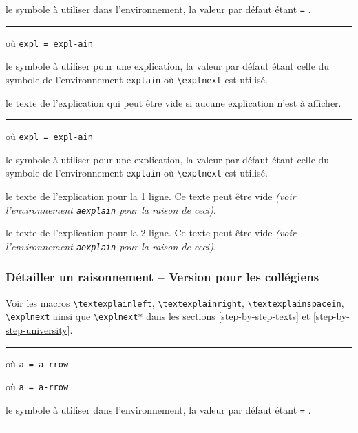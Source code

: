 \documentclass[12pt,a4paper]{article}
\newcommand\env[1]{\texttt{#1}}
\newcommand\macro[1]{\env{\textbackslash{}#1}}
\theoremstyle{definition}
\newcommand\separation{
	\medskip
	\hfill\rule{0.5\textwidth}{0.75pt}\hfill
	\medskip
}
\newcommand\extraspace{
	\vspace{0.25em}
}
\newcommand\mwhyprefix[2]{%
	\texttt{#1 = #1-#2}%
}
\begin{document}

\IDoption{} le symbole à utiliser dans l'environnement, la valeur par défaut étant \verb+=+ .


\separation


 où \quad \mwhyprefix{expl}{ain}

\IDoption{} le symbole à utiliser pour une explication, la valeur par défaut étant celle du symbole de l'environnement \env{explain} où \macro{explnext} est utilisé.

\IDarg{} le texte de l'explication qui peut être vide si aucune explication n'est à afficher.


\separation


 où \quad \mwhyprefix{expl}{ain}

\IDoption{} le symbole à utiliser pour une explication, la valeur par défaut étant celle du symbole de l'environnement \env{explain} où \macro{explnext} est utilisé.

 le texte de l'explication pour la 1\iere{} ligne.
          Ce texte peut être vide \emph{(voir l'environnement \env{aexplain} pour la raison de ceci)}.

 le texte de l'explication pour la 2\ieme{} ligne.
          Ce texte peut être vide \emph{(voir l'environnement \env{aexplain} pour la raison de ceci)}.





\subsubsection{Détailler un raisonnement -- Version pour les collégiens}

Voir les macros
\macro{textexplainleft},
\macro{textexplainright},
\macro{textexplainspacein},
\macro{explnext} ainsi que
\macro{explnext*}
dans les sections \ref{step-by-step-texts} et \ref{step-by-step-university}.

\separation

  où \quad \mwhyprefix{a}{rrow}

  où \quad \mwhyprefix{a}{rrow}

\IDoption{} le symbole à utiliser dans l'environnement, la valeur par défaut étant \verb+=+ .


\separation


\extraspace
\end{document}
